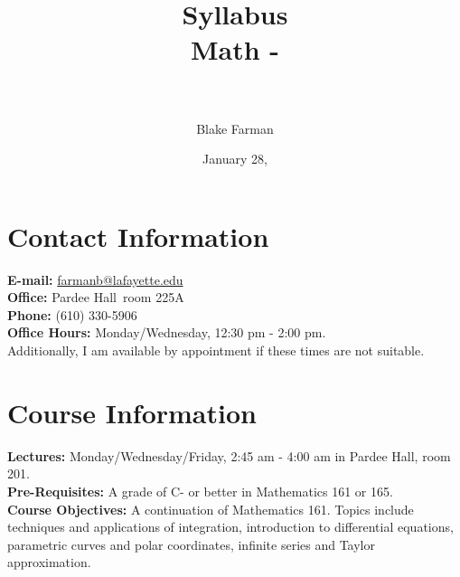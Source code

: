 \documentclass[12pt]{amsart}
\author{Blake Farman}
\title[Syllabus]{Syllabus\\Math \course-\courseSection \\ \semester\ \year}
\date{January 28, \year}
\def\building{Pardee Hall}
\def\officeNumber{225A}
\begin{document}
\maketitle

\section*{Contact Information}
\noindent
\textbf{E-mail:} \href{mailto:farmanb@lafayette.edu}{farmanb@lafayette.edu}\\
\textbf{Office:} \building\ room \officeNumber\\
\textbf{Phone:} (610) 330-5906\\
\textbf{Office Hours:} Monday/Wednesday, 12:30 pm - 2:00 pm.\\
Additionally, I am available by appointment if these times are not suitable.

\section*{Course Information}
\noindent
\textbf{Lectures:}
Monday/Wednesday/Friday, 2:45 am - 4:00 am in Pardee Hall, room 201.\\

\noindent\textbf{Pre-Requisites:} A grade of C- or better in Mathematics 161 or 165.\\

\noindent\textbf{Course Objectives:}
A continuation of Mathematics 161.
Topics include techniques and applications of integration, introduction to differential equations, parametric curves and polar coordinates, infinite series and Taylor approximation.\\
\end{document}
